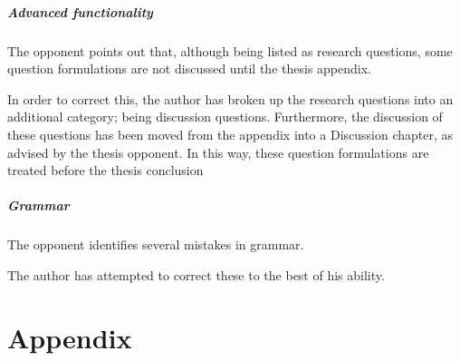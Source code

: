 \documentclass[a4paper,oneside]{bth}
\begin{document}
\paragraph{Advanced functionality}
The opponent points out that, although being listed as research questions, some question formulations are not discussed until the thesis appendix.

In order to correct this, the author has broken up the research questions into an additional category; being discussion questions.
Furthermore, the discussion of these questions has been moved from the appendix into a Discussion chapter, as advised by the thesis opponent.
In this way, these question formulations are treated before the thesis conclusion

\paragraph{Grammar}
The opponent identifies several mistakes in grammar.

The author has attempted to correct these to the best of his ability.

\chapter{Appendix}



\end{document}
